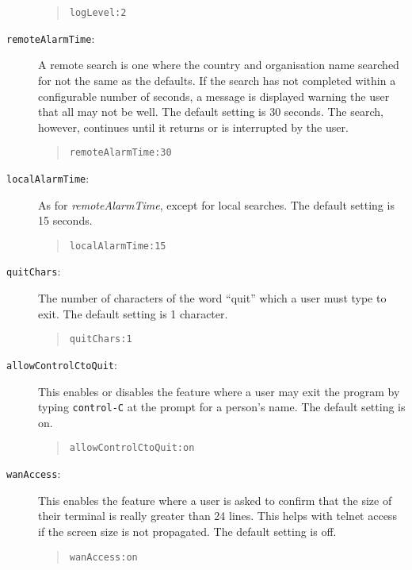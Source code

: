 \begin{description}
\begin{quote}\small\begin{verbatim}
logLevel:2
\end{verbatim}\end{quote}

\item [\verb+remoteAlarmTime+:]  A remote search is one where
the country and organisation name searched for not the same as
the defaults.  If the search has not completed within a configurable number
of seconds, a message is displayed warning the user that all may not be well.
The default setting is 30 seconds.
The search, however, continues until it returns or is interrupted by the
user.

\begin{quote}\small\begin{verbatim}
remoteAlarmTime:30
\end{verbatim}\end{quote}

\item [\verb+localAlarmTime+:]  As for {\em remoteAlarmTime}, except for 
local searches. The default setting is 15 seconds.

\begin{quote}\small\begin{verbatim}
localAlarmTime:15
\end{verbatim}\end{quote}

\item [\verb+quitChars+:]  The number of characters of the word ``quit'' 
which a user must type to exit.  The default setting is 1 character.

\begin{quote}\small\begin{verbatim}
quitChars:1
\end{verbatim}\end{quote}

\item [\verb+allowControlCtoQuit+:]  This enables or disables the feature where
a user may exit the program by typing \verb+control-C+ at the prompt for a 
person's name.  The default setting is on.

\begin{quote}\small\begin{verbatim}
allowControlCtoQuit:on
\end{verbatim}\end{quote}

\item [\verb+wanAccess+:] This enables the feature where a user is asked to
confirm that the size of their terminal is really greater than 24 lines.
This helps with telnet access if the screen size is not propagated.  The
default setting is off.

\begin{quote}\small\begin{verbatim}
wanAccess:on
\end{verbatim}\end{quote}

\end{description}

